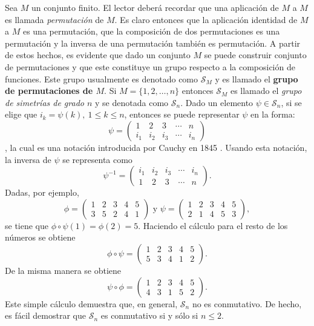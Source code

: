 \begin{ejemplo}\label{ejemplo:simetrias}
Sea $M$ un conjunto finito. El lector deberá recordar que una aplicación de $M$ a $M$ es llamada \textit{permutación} de $M$. Es claro entonces que la aplicación identidad de $M$ a $M$ es una permutación, que la composición de dos permutaciones es una permutación y la inversa de una permutación también es permutación. A partir de estos hechos, es evidente que dado un conjunto $M$ se puede construir conjunto de permutaciones y que este constituye un grupo respecto a la composición de funciones. Este grupo usualmente es denotado como $\mathcal{S}_M$ y es llamado el \textbf{grupo de permutaciones de $M$}. 
Si $M = \{  1,2,\dots, n \}$ entonces $\mathcal{S}_M$ es llamado el \textit{grupo de simetrías de grado $n$} y se denotada como $\mathcal{S}_n$. Dado un elemento $\psi \in \mathcal{S}_n$, si se elige que $i_k = \psi (k), \ 1 \leq k \leq n$, entonces se puede representar $\psi$ en la forma:
\[ \psi = \begin{pmatrix}
1 & 2 & 3 & \cdots & n \\
i_1 & i_2 & i_3 & \cdots & i_n
\end{pmatrix} \],
la cual es una notación introducida por Cauchy en 1845 \cite[vol 1, páginas 64-90]{bib:Cauchy}. Usando esta notación, la inversa de $\psi$ se representa como \[ \psi^{-1} = \begin{pmatrix}
i_1 & i_2 & i_3 & \cdots & i_n \\
1 & 2 & 3 & \cdots & n
\end{pmatrix}.
 \]
 Dadas, por ejemplo, \[ \phi = \begin{pmatrix}
 1 & 2 & 3 & 4 & 5 \\
 3 & 5 & 2 & 4 & 1
 \end{pmatrix} \mbox{ y } \psi = \begin{pmatrix}
 1 & 2 & 3 & 4 & 5 \\
  2 & 1 & 4 & 5 & 3
 \end{pmatrix}, \]
 se tiene que $\phi \circ \psi (1) = \phi(2) = 5$. Haciendo el cálculo para el resto de los números se obtiene \[ \phi \circ \psi = \begin{pmatrix}
 1 & 2 & 3 & 4 & 5 \\
  5 & 3 & 4 & 1 & 2
 \end{pmatrix}. \]
 De la misma manera se obtiene \[ \psi \circ \phi = \begin{pmatrix}
 1 & 2 & 3 & 4 & 5 \\
  4 & 3 & 1 & 5 & 2
 \end{pmatrix}. \]
 Este simple cálculo demuestra que, en general, $\mathcal{S}_n$ no es conmutativo. De hecho, es fácil demostrar que $\mathcal{S}_n$ es conmutativo si y sólo si $n \leq 2$. 
\end{ejemplo}
